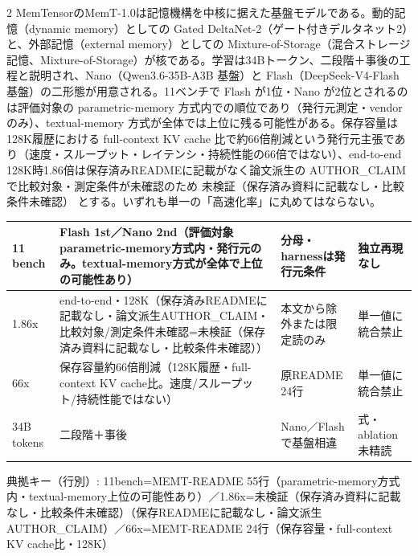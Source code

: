 \documentclass[lualatex,a4paper,10pt]{jlreq}
\begin{document}
\begin{multicols}{2}
MemTensorのMemT-1.0は記憶機構を中核に据えた基盤モデルである。動的記憶（dynamic memory）としての Gated DeltaNet-2（ゲート付きデルタネット2）と、外部記憶（external memory）としての Mixture-of-Storage（混合ストレージ記憶、Mixture-of-Storage）が核である。学習は34Bトークン、二段階＋事後の工程と説明され、Nano（Qwen3.6-35B-A3B 基盤）と Flash（DeepSeek-V4-Flash 基盤）の二形態が用意される。11ベンチで Flash が1位・Nano が2位とされるのは評価対象の parametric-memory 方式内での順位であり（発行元測定・vendorのみ）、textual-memory 方式が全体では上位に残る可能性がある。保存容量は128K履歴における full-context KV cache 比で約66倍削減という発行元主張であり（速度・スループット・レイテンシ・持続性能の66倍ではない）、end-to-end 128K時1.86倍は保存済みREADMEに記載がなく論文派生の AUTHOR\_CLAIM で比較対象・測定条件が未確認のため 未検証（保存済み資料に記載なし・比較条件未確認） とする。いずれも単一の「高速化率」に丸めてはならない。


\end{multicols} %
{\centering\footnotesize
{}
\begin{tabularx}{0.96\linewidth}{@{}lXXX@{}}
\toprule
11 bench & Flash 1st／Nano 2nd（評価対象parametric-memory方式内・発行元のみ。textual-memory方式が全体で上位の可能性あり） & 分母・harnessは発行元条件 & 独立再現なし \\
\midrule
1.86x & end-to-end・128K（保存済みREADMEに記載なし・論文派生AUTHOR\_CLAIM・比較対象/測定条件未確認=未検証（保存済み資料に記載なし・比較条件未確認）） & 本文から除外または限定読のみ & 単一値に統合禁止 \\
66x & 保存容量約66倍削減（128K履歴・full-context KV cache比。速度/スループット/持続性能ではない） & 原README 24行 & 単一値に統合禁止 \\
34B tokens & 二段階＋事後 & Nano／Flashで基盤相違 & 式・ablation未精読 \\
\bottomrule
\end{tabularx}
{\scriptsize\color{SurveyMuted} 典拠キー（行別）: 11bench=MEMT-README 55行（parametric-memory方式内・textual-memory上位の可能性あり）／1.86x=未検証（保存済み資料に記載なし・比較条件未確認）（保存READMEに記載なし・論文派生AUTHOR\_CLAIM）／66x=MEMT-README 24行（保存容量・full-context KV cache比・128K）\par}
} %
\end{document}
